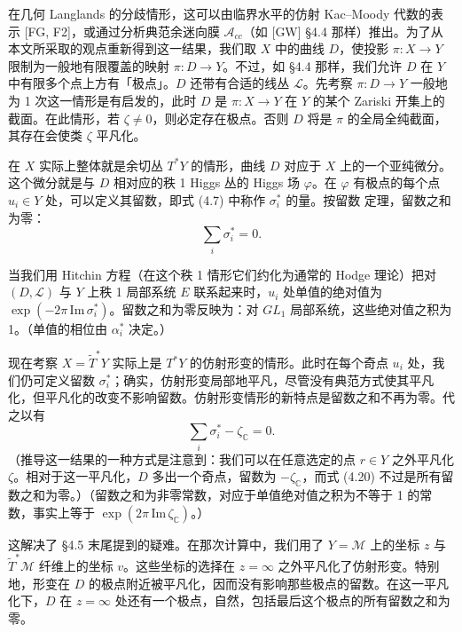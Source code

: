 \documentclass[11pt,a4paper]{article}
\begin{document}
在几何 Langlands 的分歧情形，这可以由临界水平的仿射 Kac--Moody 代数的表示 [FG, F2]，或通过分析典范余迷向膜 $\mathcal{A}_{cc}$（如 [GW] §4.4 那样）推出。为了从本文所采取的观点重新得到这一结果，我们取 $X$ 中的曲线 $D$，使投影 $\pi:X\to Y$ 限制为一般地有限覆盖的映射 $\pi:D\to Y$。不过，如 §4.4 那样，我们允许 $D$ 在 $Y$ 中有限多个点上方有「极点」。$D$ 还带有合适的线丛 $\mathcal{L}$。先考察 $\pi:D\to Y$ 一般地为 1 次这一情形是有启发的，此时 $D$ 是 $\pi:X\to Y$ 在 $Y$ 的某个 Zariski 开集上的截面。在此情形，若 $\zeta\neq0$，则必定存在极点。否则 $D$ 将是 $\pi$ 的全局全纯截面，其存在会使类 $\zeta$ 平凡化。

在 $X$ 实际上整体就是余切丛 $T^*Y$ 的情形，曲线 $D$ 对应于 $X$ 上的一个亚纯微分。这个微分就是与 $D$ 相对应的秩 1 Higgs 丛的 Higgs 场 $\varphi$。在 $\varphi$ 有极点的每个点 $u_i\in Y$ 处，可以定义其留数，即式 (4.7) 中称作 $\sigma_i^*$ 的量。按留数
定理，留数之和为零：
\begin{equation}\tag{4.19}
\sum_i\sigma_i^*=0.
\end{equation}

当我们用 Hitchin 方程（在这个秩 1 情形它们约化为通常的 Hodge 理论）把对 $(D,\mathcal{L})$ 与 $Y$ 上秩 1 局部系统 $E$ 联系起来时，$u_i$ 处单值的绝对值为 $\exp(-2\pi\,\mathrm{Im}\,\sigma_i^*)$。留数之和为零反映为：对 $GL_1$ 局部系统，这些绝对值之积为 1。（单值的相位由 $\alpha_i^*$ 决定。）

现在考察 $X=\widetilde{T}^*Y$ 实际上是 $T^*Y$ 的仿射形变的情形。此时在每个奇点 $u_i$ 处，我们仍可定义留数 $\sigma_i^*$；确实，仿射形变局部地平凡，尽管没有典范方式使其平凡化，但平凡化的改变不影响留数。仿射形变情形的新特点是留数之和不再为零。代之以有
\begin{equation}\tag{4.20}
\sum_i\sigma_i^*-\zeta_{\mathbb{C}}=0.
\end{equation}
（推导这一结果的一种方式是注意到：我们可以在任意选定的点 $r\in Y$ 之外平凡化 $\zeta$。相对于这一平凡化，$D$ 多出一个奇点，留数为 $-\zeta_{\mathbb{C}}$，而式 (4.20) 不过是所有留数之和为零。）（留数之和为非零常数，对应于单值绝对值之积为不等于 1 的常数，事实上等于 $\exp(2\pi\,\mathrm{Im}\,\zeta_{\mathbb{C}})$。）

这解决了 §4.5 末尾提到的疑难。在那次计算中，我们用了 $Y=\mathcal{M}$ 上的坐标 $z$ 与 $\widetilde{T}^*\mathcal{M}$ 纤维上的坐标 $v$。这些坐标的选择在 $z=\infty$ 之外平凡化了仿射形变。特别地，形变在 $D$ 的极点附近被平凡化，因而没有影响那些极点的留数。在这一平凡化下，$D$ 在 $z=\infty$ 处还有一个极点，自然，包括最后这个极点的所有留数之和为零。
\end{document}
